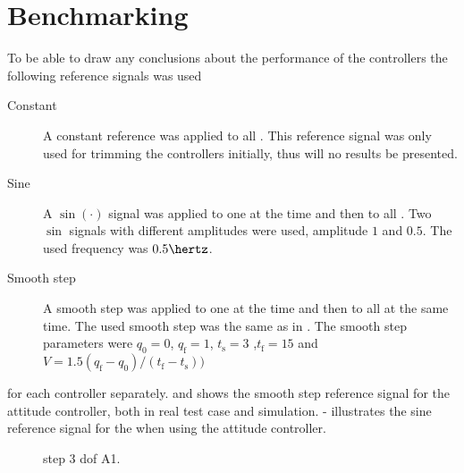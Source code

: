 \section{Benchmarking}
To be able to draw any conclusions about the performance of the controllers the following reference signals was used
\begin{description}
\item[Constant] A constant reference was applied to all \abbrDOF. This reference signal was only used for trimming the controllers initially, thus will no results be presented.

\item[Sine] A $\sin(\cdot)$ signal was applied to one \abbrDOF at the time and then to all \abbrDOF. Two $\sin$ signals with different amplitudes were used, amplitude $1$ and $0.5$. The used frequency was $0.5 \hertz$.

\item[Smooth step] A smooth step was applied to one \abbrDOF at the time and then to all \abbrDOF at the same time. The used smooth step was the same as in \citet[p. 192-195]{robotics}. The smooth step parameters were $q_{\text{0}} = 0$, $q_{\text{f}} = 1$, $t_{\text{s}} = 3$ ,$t_{\text{f}} = 15$ and $V = 1.5 (q_{\text{f}} - q_{\text{0}})/(t_{\text{f}} - t_{\text{s}}))$
\end{description}
for each controller separately.  and  shows the smooth step reference signal for the attitude controller, both in real test case and simulation.  -  illustrates the sine reference signal for the when using the attitude controller.
\begin{figure}[tbp]
  \centering
  \qquad
  \qquad
  \qquad
  \qquad
  \qquad
   \caption{\label{fig:StepAttitude}%
    step 3 dof A1.}
\end{figure}

